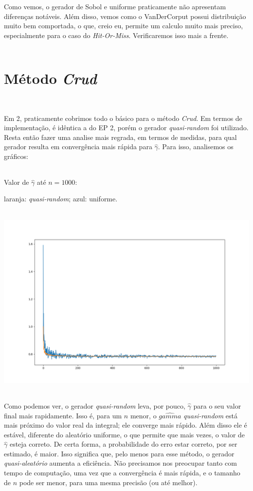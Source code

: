 \documentclass[pt12]{article}
\begin{document}
Como vemos, o gerador de Sobol e uniforme praticamente não apresentam diferenças notáveis. Além disso, vemos como o VanDerCorput possui distribuição muito bem comportada, o que, creio eu, permite um calculo muito mais preciso, especialmente para o caso do \textit{Hit-Or-Miss}. Verificaremos isso mais a frente.\\
\ 

\section{Método \textit{Crud}}
\ 

Em 2, praticamente cobrimos todo o básico para o método \textit{Crud}. Em termos de implementação, é idêntica a do EP 2, porém o gerador \textit{quasi-random} foi utilizado. Resta então fazer uma analise mais regrada, em termos de medidas, para qual gerador resulta em convergência mais rápida para $\hat{\gamma}$. Para isso, analisemos os gráficos:\\
\ 

Valor de $\hat{\gamma}$ até $n=1000$:\\
\indent \begin{small}laranja: \textit{quasi-random}; azul: uniforme.\end{small}\\
\includegraphics[scale=0.5]{conver_crud.png}\\
\ 

Como podemos ver, o gerador \textit{quasi-random} leva, por pouco, $\hat{\gamma}$ para o seu valor final mais rapidamente. Isso é, para um $n$ menor, o $\hat{gamma}$ \textit{quasi-random} está mais próximo do valor real da integral; ele converge mais rápido. Além disso ele é estável, diferente do aleatório uniforme, o que permite que mais vezes, o valor de $\hat{\gamma}$ esteja correto. De certa forma, a probabilidade do erro estar correto, por ser estimado, é maior. Isso significa que, pelo menos para esse método, o gerador \textit{quasi-aleatório} aumenta a eficiência. Não precisamos nos preocupar tanto com tempo de computação, uma vez que a convergência é mais rápida, e o tamanho de $n$ pode ser menor, para uma mesma precisão (ou até melhor).\\
\ 
\newpage
\end{document}
